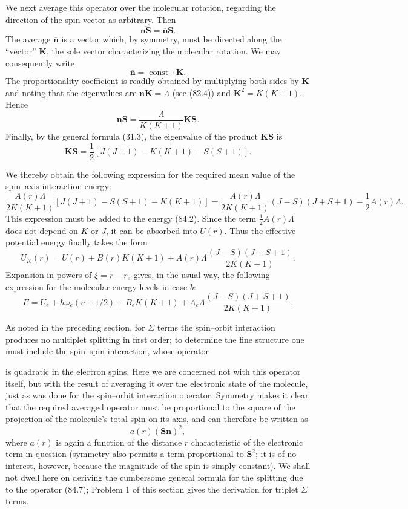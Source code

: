 We next average this operator over the molecular rotation, regarding the direction of the spin vector as arbitrary. Then
\[
 \overline{\mathbf n\mathbf S}=\overline{\mathbf n}\mathbf S.
\]
The average $\overline{\mathbf n}$ is a vector which, by symmetry, must be directed along the ``vector'' $\mathbf K$, the sole vector characterizing the molecular rotation. We may consequently write
\[
 \overline{\mathbf n}=\operatorname{const}\cdot\mathbf K.
\]
The proportionality coefficient is readily obtained by multiplying both sides by $\mathbf K$ and noting that the eigenvalues are $\mathbf n\mathbf K=\Lambda$ (see (82.4)) and $\mathbf K^2=K(K+1)$. Hence
\[
 \overline{\mathbf n\mathbf S}=\frac{\Lambda}{K(K+1)}\mathbf K\mathbf S.
\]
Finally, by the general formula (31.3), the eigenvalue of the product $\mathbf K\mathbf S$ is
\begin{equation}
 \mathbf K\mathbf S=\frac12[J(J+1)-K(K+1)-S(S+1)].
 \tag{84.4}
\end{equation}

We thereby obtain the following expression for the required mean value of the spin--axis interaction energy:
\[
 \frac{A(r)\Lambda}{2K(K+1)}[J(J+1)-S(S+1)-K(K+1)]
 =\frac{A(r)\Lambda}{2K(K+1)}(J-S)(J+S+1)-\frac12A(r)\Lambda.
\]
This expression must be added to the energy (84.2). Since the term $\frac12A(r)\Lambda$ does not depend on $K$ or $J$, it can be absorbed into $U(r)$. Thus the effective potential energy finally takes the form
\begin{equation}
 U_K(r)=U(r)+B(r)K(K+1)+A(r)\Lambda\frac{(J-S)(J+S+1)}{2K(K+1)}.
 \tag{84.5}
\end{equation}
Expansion in powers of $\xi=r-r_e$ gives, in the usual way, the following expression for the molecular energy levels in case $b$:
\begin{equation}
 E=U_e+\hbar\omega_e(v+1/2)+B_eK(K+1)+A_e\Lambda\frac{(J-S)(J+S+1)}{2K(K+1)}.
 \tag{84.6}
\end{equation}

As noted in the preceding section, for $\Sigma$ terms the spin--orbit interaction produces no multiplet splitting in first order; to determine the fine structure one must include the spin--spin interaction, whose operator

is quadratic in the electron spins. Here we are concerned not with this operator itself, but with the result of averaging it over the electronic state of the molecule, just as was done for the spin--orbit interaction operator. Symmetry makes it clear that the required averaged operator must be proportional to the square of the projection of the molecule's total spin on its axis, and can therefore be written as
\begin{equation}
 a(r)(\mathbf S\mathbf n)^2,
 \tag{84.7}
\end{equation}
where $a(r)$ is again a function of the distance $r$ characteristic of the electronic term in question (symmetry also permits a term proportional to $\mathbf S^2$; it is of no interest, however, because the magnitude of the spin is simply constant). We shall not dwell here on deriving the cumbersome general formula for the splitting due to the operator (84.7); Problem 1 of this section gives the derivation for triplet $\Sigma$ terms.

